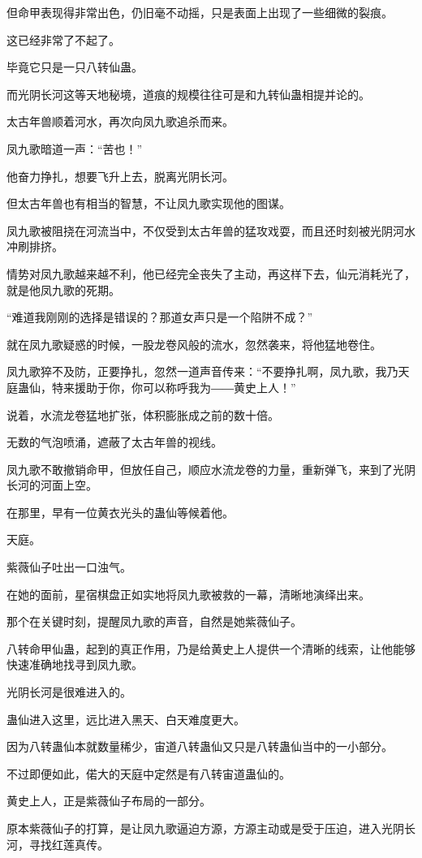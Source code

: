 \begin{this_body}
但命甲表现得非常出色，仍旧毫不动摇，只是表面上出现了一些细微的裂痕。

这已经非常了不起了。

毕竟它只是一只八转仙蛊。

而光阴长河这等天地秘境，道痕的规模往往可是和九转仙蛊相提并论的。

太古年兽顺着河水，再次向凤九歌追杀而来。

凤九歌暗道一声：“苦也！”

他奋力挣扎，想要飞升上去，脱离光阴长河。

但太古年兽也有相当的智慧，不让凤九歌实现他的图谋。

凤九歌被阻挠在河流当中，不仅受到太古年兽的猛攻戏耍，而且还时刻被光阴河水冲刷排挤。

情势对凤九歌越来越不利，他已经完全丧失了主动，再这样下去，仙元消耗光了，就是他凤九歌的死期。

“难道我刚刚的选择是错误的？那道女声只是一个陷阱不成？”

就在凤九歌疑惑的时候，一股龙卷风般的流水，忽然袭来，将他猛地卷住。

凤九歌猝不及防，正要挣扎，忽然一道声音传来：“不要挣扎啊，凤九歌，我乃天庭蛊仙，特来援助于你，你可以称呼我为――黄史上人！”

说着，水流龙卷猛地扩张，体积膨胀成之前的数十倍。

无数的气泡喷涌，遮蔽了太古年兽的视线。

凤九歌不敢撤销命甲，但放任自己，顺应水流龙卷的力量，重新弹飞，来到了光阴长河的河面上空。

在那里，早有一位黄衣光头的蛊仙等候着他。

天庭。

紫薇仙子吐出一口浊气。

在她的面前，星宿棋盘正如实地将凤九歌被救的一幕，清晰地演绎出来。

那个在关键时刻，提醒凤九歌的声音，自然是她紫薇仙子。

八转命甲仙蛊，起到的真正作用，乃是给黄史上人提供一个清晰的线索，让他能够快速准确地找寻到凤九歌。

光阴长河是很难进入的。

蛊仙进入这里，远比进入黑天、白天难度更大。

因为八转蛊仙本就数量稀少，宙道八转蛊仙又只是八转蛊仙当中的一小部分。

不过即便如此，偌大的天庭中定然是有八转宙道蛊仙的。

黄史上人，正是紫薇仙子布局的一部分。

原本紫薇仙子的打算，是让凤九歌逼迫方源，方源主动或是受于压迫，进入光阴长河，寻找红莲真传。


\end{this_body}
